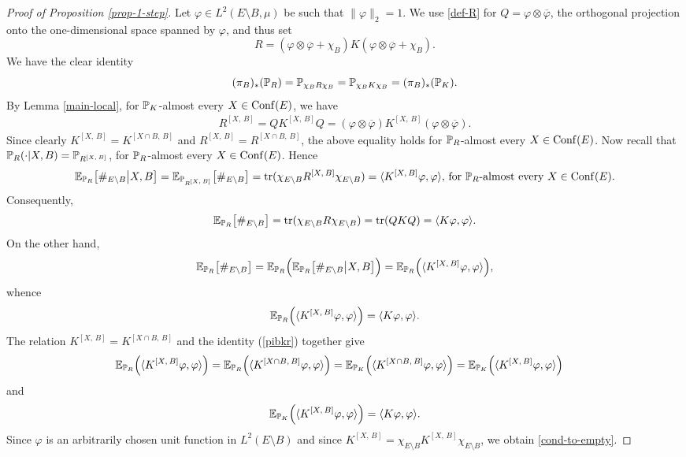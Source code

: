 \documentclass[12pt]{paper}
\numberwithin{theorem}{section}
\numberwithin{figure}{section}
\numberwithin{equation}{section}
\begin{document}
\begin{proof}[Proof of Proposition \ref{prop-1-step}]
Let $\varphi  \in L^2(E\setminus B, \mu)$ be such that $\| \varphi\|_2=1$. We use \eqref{def-R} for $Q = \varphi \otimes \overline{\varphi}$, the orthogonal projection onto the one-dimensional space spanned by $\varphi$, and thus set
\[
R = (\varphi \otimes \overline{\varphi}+\chi_B)K(\varphi \otimes \overline{\varphi}+\chi_B).
\]
 We have the clear identity
\begin{equation}\label{pibkr}
(\pi_B)_*(\mathbb{P}_R) = \mathbb{P}_{\chi_B R\chi_B}=  \mathbb{P}_{\chi_B K \chi_B} = (\pi_B)_*(\mathbb{P}_K).
\end{equation}
By Lemma \ref{main-local}, for $\mathbb{P}_K$-almost every $X\in \mathrm{Conf}(E)$, we have
\begin{align*}
R^{[X, \, B]} =  Q K^{[X, \, B]} Q  = (\varphi \otimes \overline{\varphi}) K^{[X, \, B]} (\varphi \otimes \overline{\varphi}).
\end{align*}
Since clearly $K^{[X, \, B]} = K^{[X \cap B, \, B]}$ and $R^{[X, \, B]} = R^{[X \cap B, \, B]}$, the above equality holds  for $\mathbb{P}_R$-almost every $X\in \mathrm{Conf}(E)$.
Now recall  that $\mathbb{P}_R (\cdot| X, B) = \mathbb{P}_{R^{[X,\, B]}}$, for $\mathbb{P}_R$-almost every $X\in \mathrm{Conf}(E)$. Hence
\begin{align*}
\mathbb{E}_{\mathbb{P}_{R}}\big[\#_{E\setminus B} \big| X, B \big]= \mathbb{E}_{\mathbb{P}_{R^{[X, \, B]}}}\big[\#_{E\setminus B} \big] =  \mathrm{tr} (\chi_{E\setminus B}R^{[X, \, B]}  \chi_{E\setminus B})  =\langle  K^{[X, \, B]} \varphi, \varphi \rangle, \, \text{for $\mathbb{P}_R$-almost every $X\in \mathrm{Conf}(E)$}.
\end{align*}
Consequently,
\begin{align*}
\mathbb{E}_{\mathbb{P}_{R}}\big[\#_{E\setminus B} \big] =\mathrm{tr}(\chi_{E\setminus B} R \chi_{E\setminus B})  = \mathrm{tr}(Q  K    Q) = \langle K \varphi, \varphi\rangle.
\end{align*}
On the other hand,
\begin{align*}
\mathbb{E}_{\mathbb{P}_{R}}\big[\#_{E\setminus B} \big] = \mathbb{E}_{\mathbb{P}_R} \Big(\mathbb{E}_{\mathbb{P}_{R}}\big[\#_{E\setminus B} \big| X, B \big]  \Big)  = \mathbb{E}_{\mathbb{P}_R} \Big( \langle  K^{[X, \, B]} \varphi, \varphi \rangle  \Big),
\end{align*}
whence
\[
  \mathbb{E}_{\mathbb{P}_R} \Big( \langle  K^{[X, \, B]} \varphi, \varphi \rangle  \Big) = \langle K \varphi, \varphi\rangle.
\]
 The relation  $K^{[X, \, B]} = K^{[X\cap B, \, B]}$ and the identity (\ref{pibkr}) together give
\begin{align*}
 \mathbb{E}_{\mathbb{P}_R} \Big( \langle  K^{[X, \, B]} \varphi, \varphi \rangle  \Big) &=   \mathbb{E}_{\mathbb{P}_R} \Big( \langle  K^{[X\cap B, \, B]} \varphi, \varphi \rangle  \Big) = \mathbb{E}_{\mathbb{P}_K} \Big( \langle  K^{[X\cap B, \, B]} \varphi, \varphi \rangle  \Big)  =  \mathbb{E}_{\mathbb{P}_K} \Big( \langle  K^{[X, \, B]} \varphi, \varphi \rangle  \Big)
\end{align*}
and
\begin{equation}\label{exp-kxb}
  \mathbb{E}_{\mathbb{P}_K} \Big( \langle  K^{[X, \, B]} \varphi, \varphi \rangle  \Big) = \langle K \varphi, \varphi\rangle.
\end{equation}
Since $\varphi$ is an arbitrarily chosen unit function in $L^2(E\setminus B)$ and since $K^{[X, \,B]} = \chi_{E\setminus B} K^{[X, \,B]} \chi_{E\setminus B}$, we obtain \eqref{cond-to-empty}.
\end{proof}
\end{document}

